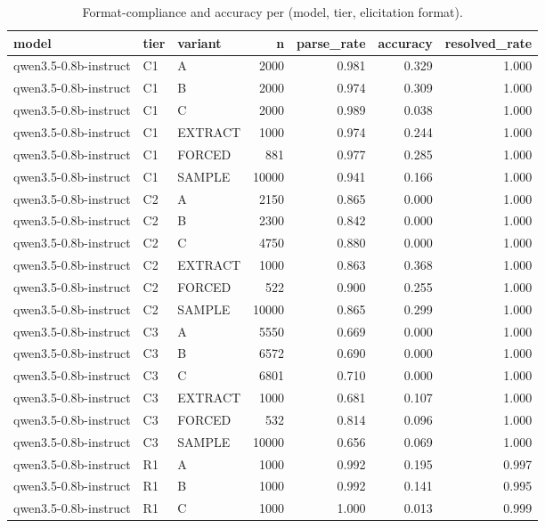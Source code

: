 \begin{table}
\caption{Format-compliance and accuracy per (model, tier, elicitation format).}
\label{tab:t3_parse_and_accuracy}
\begin{tabular}{lllrrrr}
\toprule
model & tier & variant & n & parse\_rate & accuracy & resolved\_rate \\
\midrule
qwen3.5-0.8b-instruct & C1 & A & 2000 & 0.981 & 0.329 & 1.000 \\
qwen3.5-0.8b-instruct & C1 & B & 2000 & 0.974 & 0.309 & 1.000 \\
qwen3.5-0.8b-instruct & C1 & C & 2000 & 0.989 & 0.038 & 1.000 \\
qwen3.5-0.8b-instruct & C1 & EXTRACT & 1000 & 0.974 & 0.244 & 1.000 \\
qwen3.5-0.8b-instruct & C1 & FORCED & 881 & 0.977 & 0.285 & 1.000 \\
qwen3.5-0.8b-instruct & C1 & SAMPLE & 10000 & 0.941 & 0.166 & 1.000 \\
qwen3.5-0.8b-instruct & C2 & A & 2150 & 0.865 & 0.000 & 1.000 \\
qwen3.5-0.8b-instruct & C2 & B & 2300 & 0.842 & 0.000 & 1.000 \\
qwen3.5-0.8b-instruct & C2 & C & 4750 & 0.880 & 0.000 & 1.000 \\
qwen3.5-0.8b-instruct & C2 & EXTRACT & 1000 & 0.863 & 0.368 & 1.000 \\
qwen3.5-0.8b-instruct & C2 & FORCED & 522 & 0.900 & 0.255 & 1.000 \\
qwen3.5-0.8b-instruct & C2 & SAMPLE & 10000 & 0.865 & 0.299 & 1.000 \\
qwen3.5-0.8b-instruct & C3 & A & 5550 & 0.669 & 0.000 & 1.000 \\
qwen3.5-0.8b-instruct & C3 & B & 6572 & 0.690 & 0.000 & 1.000 \\
qwen3.5-0.8b-instruct & C3 & C & 6801 & 0.710 & 0.000 & 1.000 \\
qwen3.5-0.8b-instruct & C3 & EXTRACT & 1000 & 0.681 & 0.107 & 1.000 \\
qwen3.5-0.8b-instruct & C3 & FORCED & 532 & 0.814 & 0.096 & 1.000 \\
qwen3.5-0.8b-instruct & C3 & SAMPLE & 10000 & 0.656 & 0.069 & 1.000 \\
qwen3.5-0.8b-instruct & R1 & A & 1000 & 0.992 & 0.195 & 0.997 \\
qwen3.5-0.8b-instruct & R1 & B & 1000 & 0.992 & 0.141 & 0.995 \\
qwen3.5-0.8b-instruct & R1 & C & 1000 & 1.000 & 0.013 & 0.999 \\

\end{tabular}
\end{table}
